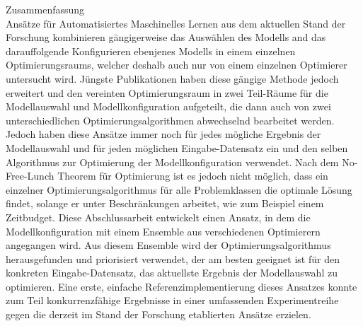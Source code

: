 {Zusammenfassung}\label{sec:abstract-ger}
\vspace*{5mm}\\
Ansätze für Automatisiertes Maschinelles Lernen aus dem aktuellen Stand der Forschung kombinieren gängigerweise das Auswählen des Modells and das darauffolgende Konfigurieren ebenjenes Modells in einem einzelnen Optimierungsraums, welcher deshalb auch nur von einem einzelnen Optimierer untersucht wird.
Jüngste Publikationen haben diese gängige Methode jedoch erweitert und den vereinten Optimierungsraum in zwei Teil-Räume für die Modellauswahl und Modellkonfiguration aufgeteilt, die dann auch von zwei unterschiedlichen Optimierungsalgorithmen abwechselnd bearbeitet werden.
Jedoch haben diese Ansätze immer noch für jedes mögliche Ergebnis der Modellauswahl und für jeden möglichen Eingabe-Datensatz ein und den selben Algorithmus zur Optimierung der Modellkonfiguration verwendet.
Nach dem No-Free-Lunch Theorem für Optimierung ist es jedoch nicht möglich, dass ein einzelner Optimierungsalgorithmus für alle Problemklassen die optimale Lösung findet, solange er unter Beschränkungen arbeitet, wie zum Beispiel einem Zeitbudget.
Diese Abschlussarbeit entwickelt einen Ansatz, in dem die Modellkonfiguration mit einem Ensemble aus verschiedenen Optimierern angegangen wird.
Aus diesem Ensemble wird der Optimierungsalgorithmus herausgefunden und priorisiert verwendet, der am besten geeignet ist für den konkreten Eingabe-Datensatz, das aktuellste Ergebnis der Modellauswahl zu optimieren.
Eine erste, einfache Referenzimplementierung dieses Ansatzes konnte zum Teil konkurrenzfähige Ergebnisse in einer umfassenden Experimentreihe gegen die derzeit im Stand der Forschung etablierten Ansätze erzielen.
